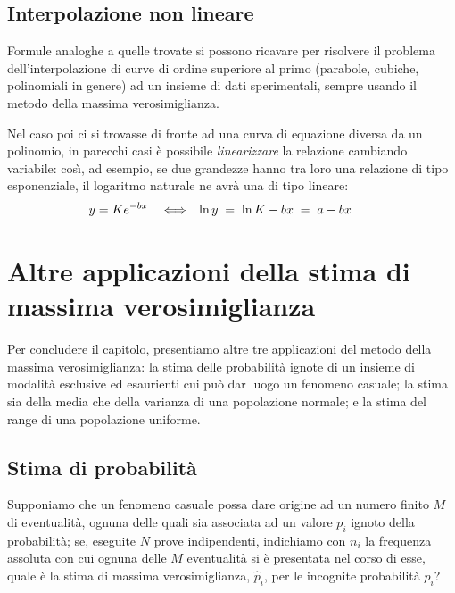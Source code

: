 \subsection{Interpolazione non lineare}
Formule analoghe a quelle trovate si possono ricavare per
risolvere il problema dell'interpolazione di curve di ordine
superiore al primo (parabole, cubiche, polinomiali in
genere) ad un insieme di dati sperimentali, sempre usando il
metodo della massima verosimiglianza.

Nel caso poi ci si trovasse di fronte ad una curva di
equazione diversa da un polinomio, in parecchi casi \`e
possibile \emph{linearizzare} la relazione cambiando
variabile: cos\`\i, ad esempio, se due grandezze hanno tra
loro una relazione di tipo esponenziale, il logaritmo
naturale ne avr\`a una di tipo lineare:
\begin{align*}
  y &= K e^{-bx} & &\Longleftrightarrow &
   \ln y \; = \; \ln K - bx \; &= \; a-bx \;\; .
\end{align*}

\section{Altre applicazioni della stima di massima
   verosimiglianza}%
%
\label{ch:11.exampl}
Per concludere il capitolo, presentiamo altre tre
applicazioni del metodo della massima verosimiglianza:
la stima delle probabilit\`a ignote di un insieme di
modalit\`a esclusive ed esaurienti cui pu\`o dar luogo un
fenomeno casuale; la stima sia della media che della
varianza di una popolazione normale; e la stima del range di
una popolazione uniforme.

\subsection{Stima di probabilit\`a}
Supponiamo che un fenomeno casuale possa dare origine ad un
numero finito $M$ di eventualit\`a, ognuna delle quali sia
associata ad un valore $p_i$ ignoto della probabilit\`a; se,
eseguite $N$ prove indipendenti, indichiamo con $n_i$ la
frequenza assoluta con cui ognuna delle $M$ eventualit\`a si
\`e presentata nel corso di esse, quale \`e la stima di
massima verosimiglianza, $\widehat p_i$, per le incognite
probabilit\`a $p_i$?


